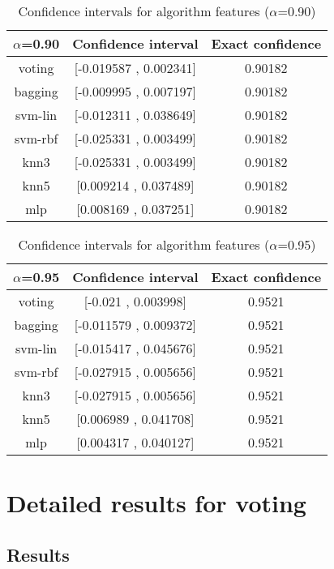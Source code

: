 \documentclass[a4paper,10pt]{article}
\begin{document}
\begin{table}[!htp]
\centering\small
\begin{tabular}{
|c|c|c|}
\hline
 $\alpha$=0.90 & Confidence interval & Exact confidence \\ \hline 
voting & [-0.019587 , 0.002341] & 0.90182\\ \hline 
bagging & [-0.009995 , 0.007197] & 0.90182\\ \hline 
svm-lin & [-0.012311 , 0.038649] & 0.90182\\ \hline 
svm-rbf & [-0.025331 , 0.003499] & 0.90182\\ \hline 
knn3 & [-0.025331 , 0.003499] & 0.90182\\ \hline 
knn5 & [0.009214 , 0.037489] & 0.90182\\ \hline 
mlp & [0.008169 , 0.037251] & 0.90182\\ \hline 

\end{tabular}
\caption{Confidence intervals for algorithm features ($\alpha$=0.90)}
\end{table}
\begin{table}[!htp]
\centering\small
\begin{tabular}{
|c|c|c|}
\hline
 $\alpha$=0.95 & Confidence interval & Exact confidence \\ \hline 
voting & [-0.021 , 0.003998] & 0.9521\\ \hline 
bagging & [-0.011579 , 0.009372] & 0.9521\\ \hline 
svm-lin & [-0.015417 , 0.045676] & 0.9521\\ \hline 
svm-rbf & [-0.027915 , 0.005656] & 0.9521\\ \hline 
knn3 & [-0.027915 , 0.005656] & 0.9521\\ \hline 
knn5 & [0.006989 , 0.041708] & 0.9521\\ \hline 
mlp & [0.004317 , 0.040127] & 0.9521\\ \hline 

\end{tabular}
\caption{Confidence intervals for algorithm features ($\alpha$=0.95)}
\end{table}

 \clearpage 


\section{Detailed results for voting}


\subsection{Results}
\end{document}
